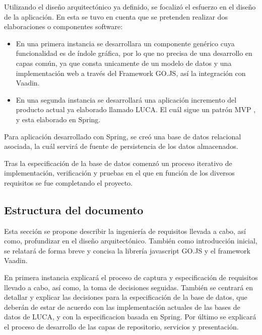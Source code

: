 \documentclass[a4paper,12pt]{article}
\begin{document}
 		\vspace{5mm}
 		
 		Utilizando el diseño arquitectónico ya definido, se focalizó el esfuerzo en el diseño de la aplicación. En esta se tuvo en cuenta que se pretenden realizar dos elaboraciones o componentes software:
 		
 		\vspace{5mm}
 		
 		\begin{itemize}
 			\item En una primera instancia se desarrollara un componente genérico cuya funcionalidad es de índole gráfica, por lo que no precisa de una desarrollo en capas común, ya que consta unicamente de un modelo de datos y una implementación web a través del Framework GO.JS, así la integración con Vaadin\cite{vaadin}.
 			
 			\item En una segunda instancia se desarrollará una aplicación incremento del producto actual ya elaborado llamado LUCA. El cuál sigue un patrón MVP \cite{mvp}, y esta elaborado en Spring\cite{spring}.
 		\end{itemize}
 	
 		\vspace{5mm}
 		
 		Para aplicación desarrollado con Spring, se creó una base de datos relacional asociada, la cuál servirá de fuente de persistencia de los datos almacenados.
 		
 		\vspace{5mm}
 		
 		Tras la especificación de la base de datos comenzó un proceso iterativo de implementación, verificación y pruebas en el que en función de los diversos requisitos se fue completando el proyecto.
 		 
	 
	 
		\subsection{Estructura del documento}
		
		Esta sección se propone describir la ingeniería de requisitos llevada a cabo, así como, profundizar en el diseño arquitectónico. También como introducción inicial, se relatará de forma breve y concisa la librería javascript GO.JS y el framework Vaadin.
		
		\vspace{5mm}
		
		 En primera instancia explicará el proceso de captura y especificación de requisitos llevado a cabo, así como, la toma de decisiones seguidas. También se centrará en detallar y explicar las decisiones para la especificación de la base de datos, que deberán de estar de acuerdo con las implementación actuales de las bases de datos de LUCA, y con la especificacion basada en Spring.	Por último se explicará el proceso de desarrollo de las capas de repositorio, servicios y presentación.
		
\end{document}

